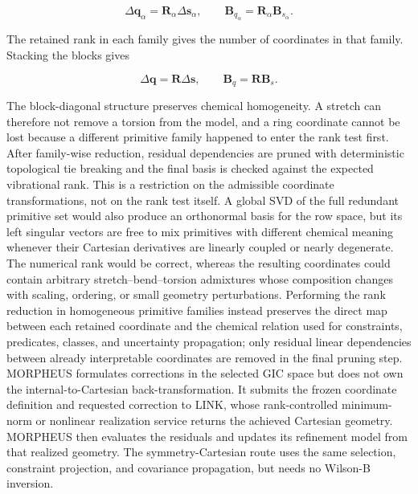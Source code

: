 \documentclass[aip,jcp,reprint,longbibliography,floatfix]{revtex4-2}
\begin{document}
\begin{equation}
\Delta \mathbf{q}_\alpha
=
\mathbf{R}_\alpha
\Delta \mathbf{s}_\alpha ,
\qquad
\mathbf{B}_{q_\alpha}
=
\mathbf{R}_\alpha
\mathbf{B}_{s_\alpha}.
\end{equation}

The retained rank in each family gives the number of coordinates in that
family. Stacking the blocks gives

\begin{equation}
\Delta \mathbf{q}
=
\mathbf{R}
\Delta \mathbf{s},
\qquad
\mathbf{B}_{q}
=
\mathbf{R}
\mathbf{B}_s .
\end{equation}

The block-diagonal structure preserves chemical homogeneity. A stretch can
therefore not remove a torsion from the model, and a ring coordinate cannot be
lost because a different primitive family happened to enter the rank test
first. After family-wise reduction, residual dependencies are pruned with
deterministic topological tie breaking and the final basis is checked against
the expected vibrational rank.
This is a restriction on the admissible coordinate transformations, not on the
rank test itself. A global SVD of the full redundant primitive set would also
produce an orthonormal basis for the row space, but its left singular vectors
are free to mix primitives with different chemical meaning whenever their
Cartesian derivatives are linearly coupled or nearly degenerate. The numerical
rank would be correct, whereas the resulting coordinates could contain
arbitrary stretch--bend--torsion admixtures whose composition changes with
scaling, ordering, or small geometry perturbations. Performing the rank
reduction in homogeneous primitive families instead preserves the direct map
between each retained coordinate and the chemical relation used for
constraints, predicates, classes, and uncertainty propagation; only residual
linear dependencies between already interpretable coordinates are removed in
the final pruning step.
MORPHEUS formulates corrections in the selected GIC space but does not own the
internal-to-Cartesian back-transformation. It submits the frozen coordinate
definition and requested correction to LINK, whose rank-controlled
minimum-norm or nonlinear realization service returns the achieved Cartesian
geometry. MORPHEUS then evaluates the residuals and updates its refinement
model from that realized geometry. The symmetry-Cartesian route uses the same
selection, constraint projection, and covariance propagation, but needs no
Wilson-B inversion.
\end{document}
